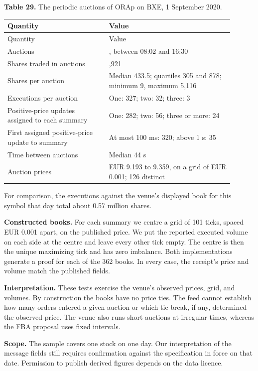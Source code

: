 \textbf{Table 29.} The periodic auctions of ORAp on BXE, 1 September 2020.

\begingroup
\setlength{\tabcolsep}{2pt}\small
\begin{longtable}{@{}>{\raggedright\arraybackslash}p{0.4050\linewidth}>{\raggedright\arraybackslash}p{0.4950\linewidth}@{}}
\toprule
Quantity & Value \\
\midrule\endfirsthead
\toprule
Quantity & Value \\
\midrule\endhead
\bottomrule\endfoot
Auctions & 362, between 08:02 and 16:30 \\
Shares traded in auctions & 238,921 \\
Shares per auction & Median 433.5; quartiles 305 and 878; minimum 9, maximum 5,116 \\
Executions per auction & One: 327; two: 32; three: 3 \\
Positive-price updates assigned to each summary & One: 282; two: 56; three or more: 24 \\
First assigned positive-price update to summary & At most 100 ms: 320; above 1 s: 35 \\
Time between auctions & Median 44 s \\
Auction prices & EUR 9.193 to 9.359, on a grid of EUR 0.001; 126 distinct \\
\end{longtable}
\endgroup

For comparison, the executions against the venue's displayed book for this symbol that day total about 0.57 million shares.

\textbf{Constructed books.} For each summary we centre a grid of 101 ticks, spaced EUR 0.001 apart, on the published price. We put the reported executed volume on each side at the centre and leave every other tick empty. The centre is then the unique maximizing tick and has zero imbalance. Both implementations generate a proof for each of the 362 books. In every case, the receipt's price and volume match the published fields.

\textbf{Interpretation.} These tests exercise the venue's observed prices, grid, and volumes. By construction the books have no price ties. The feed cannot establish how many orders entered a given auction or which tie-break, if any, determined the observed price. The venue also runs short auctions at irregular times, whereas the FBA proposal uses fixed intervals.

\textbf{Scope.} The sample covers one stock on one day. Our interpretation of the message fields still requires confirmation against the specification in force on that date. Permission to publish derived figures depends on the data licence.

